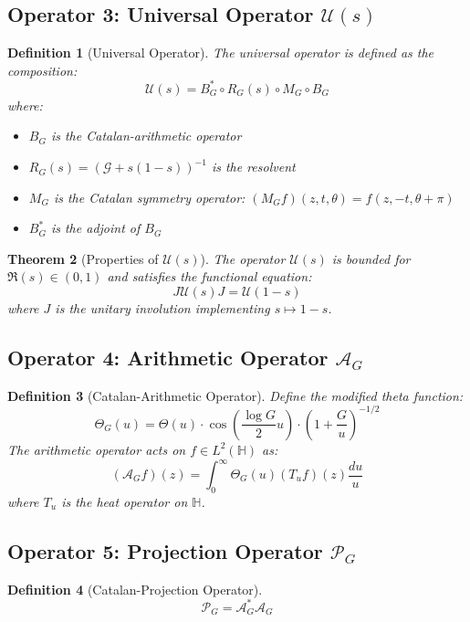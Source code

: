 \documentclass[11pt]{article}
\theoremstyle{plain}
\newtheorem{theorem}{Theorem}[section]
\newtheorem{definition}[theorem]{Definition}
\theoremstyle{remark}
\newcommand{\H}{\mathbb{H}}
\newcommand{\cU}{\mathcal{U}}
\newcommand{\cG}{\mathcal{G}}
\newcommand{\cA}{\mathcal{A}}
\newcommand{\cP}{\mathcal{P}}
\newcommand{\Catalan}{G}
\begin{document}
\subsection{Operator 3: Universal Operator $\cU(s)$}

\begin{definition}[Universal Operator]
The universal operator is defined as the composition:
\[
\cU(s) = B_{\Catalan}^* \circ R_{\Catalan}(s) \circ M_{\Catalan} \circ B_{\Catalan}
\]
where:
\begin{itemize}
\item $B_{\Catalan}$ is the Catalan-arithmetic operator
\item $R_{\Catalan}(s) = (\cG + s(1-s))^{-1}$ is the resolvent
\item $M_{\Catalan}$ is the Catalan symmetry operator: $(M_{\Catalan} f)(z,t,\theta) = f(z, -t, \theta + \pi)$
\item $B_{\Catalan}^*$ is the adjoint of $B_{\Catalan}$
\end{itemize}
\end{definition}

\begin{theorem}[Properties of $\cU(s)$]
The operator $\cU(s)$ is bounded for $\Re(s) \in (0,1)$ and satisfies the functional equation:
\[
J \cU(s) J = \cU(1-s)
\]
where $J$ is the unitary involution implementing $s \mapsto 1-s$.
\end{theorem}

\subsection{Operator 4: Arithmetic Operator $\cA_{\Catalan}$}

\begin{definition}[Catalan-Arithmetic Operator]
Define the modified theta function:
\[
\Theta_{\Catalan}(u) = \Theta(u) \cdot \cos\left(\frac{\log \Catalan}{2} u\right) \cdot \left(1 + \frac{\Catalan}{u}\right)^{-1/2}
\]
The arithmetic operator acts on $f \in L^2(\H)$ as:
\[
(\cA_{\Catalan} f)(z) = \int_0^\infty \Theta_{\Catalan}(u) (T_u f)(z) \frac{du}{u}
\]
where $T_u$ is the heat operator on $\H$.
\end{definition}

\subsection{Operator 5: Projection Operator $\cP_{\Catalan}$}

\begin{definition}[Catalan-Projection Operator]
\[
\cP_{\Catalan} = \cA_{\Catalan}^* \cA_{\Catalan}
\]
\end{definition}
\end{document}
